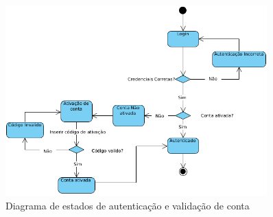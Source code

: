 \begin{figure}[htb]
  \centering
  \includegraphics[width=0.9\textwidth]{images/diagramas/estados/autenticacao.png}
  \caption{Diagrama de estados de autenticação e validação de conta}
  \label{fig:42}
\end{figure}